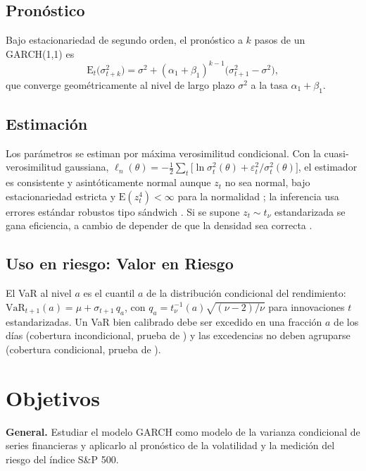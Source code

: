\documentclass[legalpaper,11pt]{article}
\newcommand{\E}{\mathrm{E}}
\begin{document}
\subsection{Pronóstico}
Bajo estacionariedad de segundo orden, el pronóstico a $k$ pasos de un GARCH(1,1) es
\begin{equation}\label{eq:pronostico}
\E_t\big(\sigma_{t+k}^2\big)=\sigma^2+(\alpha_1+\beta_1)^{k-1}\big(\sigma_{t+1}^2-\sigma^2\big),
\end{equation}
que converge geométricamente al nivel de largo plazo $\sigma^2$ a la tasa $\alpha_1+\beta_1$.

\subsection{Estimación}
Los parámetros se estiman por máxima verosimilitud condicional. Con la cuasi-verosimilitud
gaussiana, $\ell_n(\theta)=-\tfrac12\sum_t\big[\ln\sigma_t^2(\theta)+\varepsilon_t^2/\sigma_t^2(\theta)\big]$,
el estimador es consistente y asintóticamente normal aunque $z_t$ no sea normal, bajo
estacionariedad estricta y $\E(z_t^4)<\infty$ para la normalidad \citep{francq2004}; la
inferencia usa errores estándar robustos tipo sándwich \citep{bollerslev1992}. Si se supone
$z_t\sim t_\nu$ estandarizada se gana eficiencia, a cambio de depender de que la densidad sea
correcta \citep[cap.~9]{francq2010}.

\subsection{Uso en riesgo: Valor en Riesgo}
El VaR al nivel $a$ es el cuantil $a$ de la distribución condicional del rendimiento:
$\mathrm{VaR}_{t+1}(a)=\mu+\sigma_{t+1}\,q_a$, con
$q_a=t_\nu^{-1}(a)\sqrt{(\nu-2)/\nu}$ para innovaciones $t$ estandarizadas. Un VaR bien
calibrado debe ser excedido en una fracción $a$ de los días (cobertura incondicional,
prueba de \citealp{kupiec1995}) y las excedencias no deben agruparse (cobertura condicional,
prueba de \citealp{christoffersen1998}).

\section{Objetivos}\label{sec:objetivos}

\textbf{General.} Estudiar el modelo GARCH como modelo de la varianza condicional de series
financieras y aplicarlo al pronóstico de la volatilidad y la medición del riesgo del índice
S\&P 500.
\end{document}
